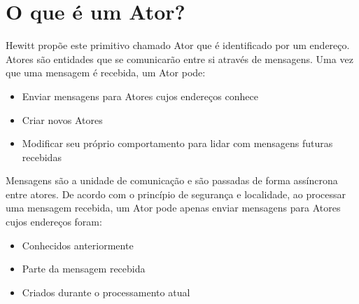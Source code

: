 \section{O que é um Ator?}

Hewitt propõe este primitivo chamado Ator que é identificado por um endereço. Atores são entidades que se comunicarão entre si através de mensagens. Uma vez que uma mensagem é recebida, um Ator pode:

\begin{itemize}
    \item Enviar mensagens para Atores cujos endereços conhece
    \item Criar novos Atores
    \item Modificar seu próprio comportamento para lidar com mensagens futuras recebidas
\end{itemize}

Mensagens são a unidade de comunicação e são passadas de forma assíncrona entre atores. De acordo com o princípio de segurança e localidade, ao processar uma mensagem recebida, um Ator pode apenas enviar mensagens para Atores cujos endereços foram:

\begin{itemize}
    \item Conhecidos anteriormente
    \item Parte da mensagem recebida
    \item Criados durante o processamento atual
\end{itemize}
